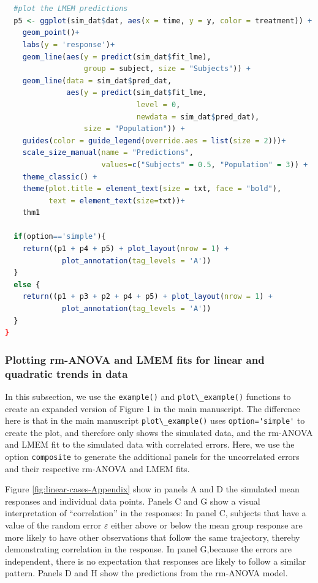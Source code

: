 \documentclass[
]{article}
\newcommand{\passthrough}[1]{#1}
\begin{document}
\begin{lstlisting}[language=R]
  
  
  #plot the LMEM predictions
  p5 <- ggplot(sim_dat$dat, aes(x = time, y = y, color = treatment)) +
    geom_point()+
    labs(y = 'response')+
    geom_line(aes(y = predict(sim_dat$fit_lme),
                  group = subject, size = "Subjects")) +
    geom_line(data = sim_dat$pred_dat,
              aes(y = predict(sim_dat$fit_lme, 
                              level = 0,
                              newdata = sim_dat$pred_dat),
                  size = "Population")) +
    guides(color = guide_legend(override.aes = list(size = 2)))+
    scale_size_manual(name = "Predictions",
                      values=c("Subjects" = 0.5, "Population" = 3)) +
    theme_classic() +
    theme(plot.title = element_text(size = txt, face = "bold"),
          text = element_text(size=txt))+
    thm1
  
  if(option=='simple'){
    return((p1 + p4 + p5) + plot_layout(nrow = 1) + 
             plot_annotation(tag_levels = 'A'))
  }
  else {
    return((p1 + p3 + p2 + p4 + p5) + plot_layout(nrow = 1) + 
             plot_annotation(tag_levels = 'A'))
  }
}
\end{lstlisting}

\hypertarget{plotting-rm-anova-and-lmem-fits-for-linear-and-quadratic-trends-in-data}{%
\subsubsection{Plotting rm-ANOVA and LMEM fits for linear and quadratic trends in data}\label{plotting-rm-anova-and-lmem-fits-for-linear-and-quadratic-trends-in-data}}

In this subsection, we use the \passthrough{\lstinline!example()!} and \passthrough{\lstinline!plot\_example()!} functions to create an expanded version of Figure 1 in the main manuscript. The difference here is that in the main manuscript \passthrough{\lstinline!plot\_example()!} uses \passthrough{\lstinline!option='simple'!} to create the plot, and therefore only shows the simulated data, and the rm-ANOVA and LMEM fit to the simulated data with correlated errors. Here, we use the option \passthrough{\lstinline!composite!} to generate the additional panels for the uncorrelated errors and their respective rm-ANOVA and LMEM fits.

Figure \ref{fig:linear-cases-Appendix} show in panels A and D the simulated mean responses and individual data points. Panels C and G show a visual interpretation of ``correlation'' in the responses: In panel C, subjects that have a value of the random error \(\varepsilon\) either above or below the mean group response are more likely to have other observations that follow the same trajectory, thereby demonstrating correlation in the response. In panel G,because the errors are independent, there is no expectation that responses are likely to follow a similar pattern. Panels D and H show the predictions from the rm-ANOVA model.
\end{document}
